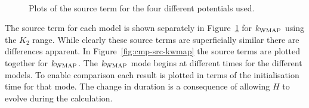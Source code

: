 \begin{figure}[h]
\centering%
\qquad%
\\%
\qquad%
\caption[The source term for different potentials]{Plots of the source term for the
four different potentials used.}
\label{fig:sourcecomparison-res}
\end{figure}
% 
The source term for each model is shown separately in Figure~\ref{fig:sourcecomparison-res} for
$k_\mathrm{WMAP}$ using the $K_2$ range\footnotemark. 
% 
% 
While clearly these source terms are superficially similar
there are differences apparent. In Figure~\ref{fig:cmp-src-kwmap} the source terms are plotted
together for $k_\mathrm{WMAP}$. The $k_\mathrm{WMAP}$ mode begins at different times for the
different models. To enable comparison each result is plotted in terms of the
initialisation time for that mode.  The change in duration is a consequence of
allowing $H$ to evolve during the calculation. 

